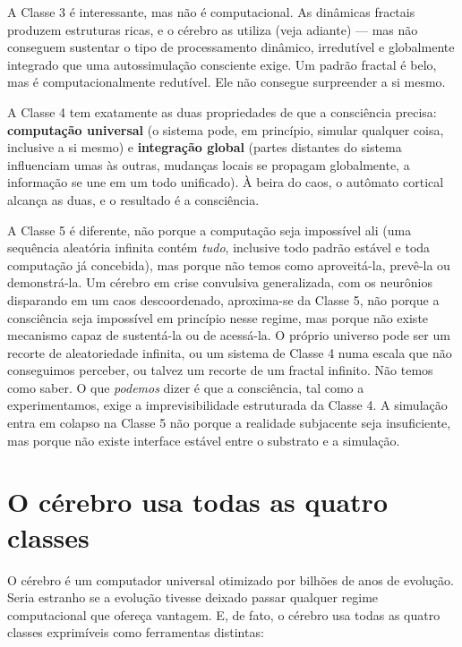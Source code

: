 \documentclass[11pt, twoside, openright]{book}
\begin{document}
A Classe 3 é interessante, mas não é computacional. As dinâmicas fractais produzem estruturas ricas, e o cérebro as utiliza (veja adiante) --- mas não conseguem sustentar o tipo de processamento dinâmico, irredutível e globalmente integrado que uma autossimulação consciente exige. Um padrão fractal é belo, mas é computacionalmente redutível. Ele não consegue surpreender a si mesmo.

A Classe 4 tem exatamente as duas propriedades de que a consciência precisa: \textbf{computação universal} (o sistema pode, em princípio, simular qualquer coisa, inclusive a si mesmo) e \textbf{integração global} (partes distantes do sistema influenciam umas às outras, mudanças locais se propagam globalmente, a informação se une em um todo unificado). À beira do caos, o autômato cortical alcança as duas, e o resultado é a consciência.

A Classe 5 é diferente, não porque a computação seja impossível ali (uma sequência aleatória infinita contém \textit{tudo}, inclusive todo padrão estável e toda computação já concebida), mas porque não temos como aproveitá-la, prevê-la ou demonstrá-la. Um cérebro em crise convulsiva generalizada, com os neurônios disparando em um caos descoordenado, aproxima-se da Classe 5, não porque a consciência seja impossível em princípio nesse regime, mas porque não existe mecanismo capaz de sustentá-la ou de acessá-la. O próprio universo pode ser um recorte de aleatoriedade infinita, ou um sistema de Classe 4 numa escala que não conseguimos perceber, ou talvez um recorte de um fractal infinito. Não temos como saber. O que \textit{podemos} dizer é que a consciência, tal como a experimentamos, exige a imprevisibilidade estruturada da Classe 4. A simulação entra em colapso na Classe 5 não porque a realidade subjacente seja insuficiente, mas porque não existe interface estável entre o substrato e a simulação.

\section*{O cérebro usa todas as quatro classes}

O cérebro é um computador universal otimizado por bilhões de anos de evolução. Seria estranho se a evolução tivesse deixado passar qualquer regime computacional que ofereça vantagem. E, de fato, o cérebro usa todas as quatro classes exprimíveis como ferramentas distintas:
\end{document}
